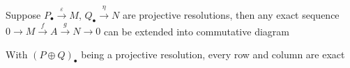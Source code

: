 \documentclass[main]{subfiles}
\begin{document}
\begin{lemma}\label{Horseshoe lemma}
Suppose $P_\bullet\xrightarrow{\varepsilon} M$, $Q_\bullet\xrightarrow{\eta} N$ are projective resolutions, then any exact sequence $0\to M\xrightarrow{f}A\xrightarrow{g}N\to0$ can be extended into commutative diagram
\begin{center}
\end{center}
With $(P\oplus Q)_\bullet$ being a projective resolution, every row and column are exact
\end{lemma}
\end{document}

